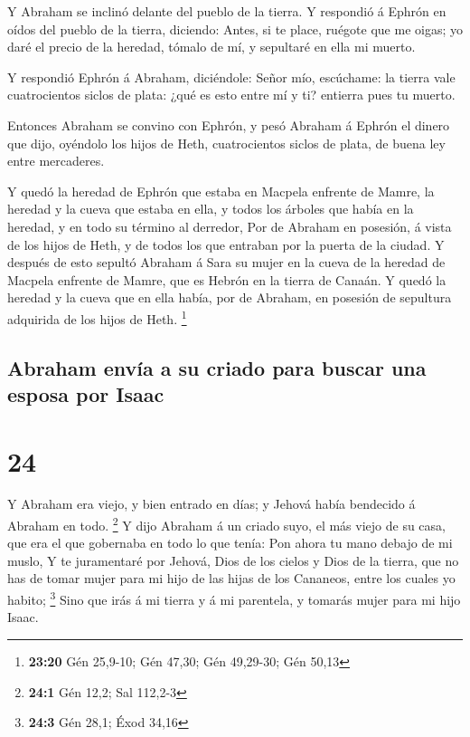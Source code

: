  Y Abraham se inclinó delante del pueblo de la tierra.
 Y respondió á Ephrón en oídos del pueblo de la tierra,
diciendo: Antes, si te place, ruégote que me oigas; yo daré el precio de
la heredad, tómalo de mí, y sepultaré en ella mi muerto.

 Y respondió Ephrón á Abraham, diciéndole:
 Señor mío, escúchame: la tierra vale cuatrocientos
siclos de plata: ¿qué es esto entre mí y ti? entierra pues tu muerto.

 Entonces Abraham se convino con Ephrón, y pesó Abraham á
Ephrón el dinero que dijo, oyéndolo los hijos de Heth, cuatrocientos
siclos de plata, de buena ley entre mercaderes.

 Y quedó la heredad de Ephrón que estaba en Macpela
enfrente de Mamre, la heredad y la cueva que estaba en ella, y todos los
árboles que había en la heredad, y en todo su término al derredor,
 Por de Abraham en posesión, á vista de los hijos de
Heth, y de todos los que entraban por la puerta de la ciudad.
 Y después de esto sepultó Abraham á Sara su mujer en la
cueva de la heredad de Macpela enfrente de Mamre, que es Hebrón en la
tierra de Canaán.  Y quedó la heredad y la cueva que en
ella había, por de Abraham, en posesión de sepultura adquirida de los
hijos de Heth. \footnote{\textbf{23:20} Gén 25,9-10; Gén 47,30; Gén
  49,29-30; Gén 50,13}

\hypertarget{abraham-envuxeda-a-su-criado-para-buscar-una-esposa-por-isaac}{%
\subsection{Abraham envía a su criado para buscar una esposa por
Isaac}\label{abraham-envuxeda-a-su-criado-para-buscar-una-esposa-por-isaac}}

\hypertarget{section-23}{%
\section{24}\label{section-23}}

 Y Abraham era viejo, y bien entrado en días; y Jehová
había bendecido á Abraham en todo. \footnote{\textbf{24:1} Gén 12,2; Sal
  112,2-3}  Y dijo Abraham á un criado suyo, el más viejo
de su casa, que era el que gobernaba en todo lo que tenía: Pon ahora tu
mano debajo de mi muslo,  Y te juramentaré por Jehová,
Dios de los cielos y Dios de la tierra, que no has de tomar mujer para
mi hijo de las hijas de los Cananeos, entre los cuales yo habito;
\footnote{\textbf{24:3} Gén 28,1; Éxod 34,16}  Sino que
irás á mi tierra y á mi parentela, y tomarás mujer para mi hijo Isaac.

